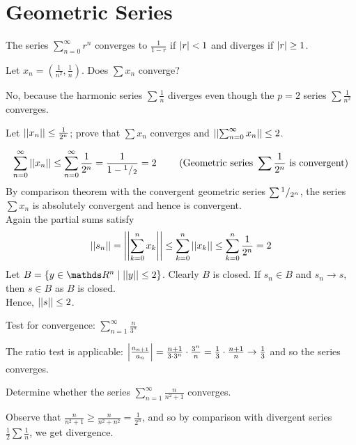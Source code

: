 \documentclass[../main-sheet.tex]{subfiles}
\begin{document}
\section{Geometric Series}
The series $ \sum_{n=0}^\infty r^n $ converges to $ \frac{1}{1-r} $ if $ \left\vert r\right\vert<1 $ and diverges if $ \left\vert r\right\vert\geq 1 $.
\begin{prob}
    Let $ x_n=\left( \frac{1}{n^2},\frac{1}{n} \right) $. Does $ \sum x_n $ converge?
\end{prob}
\begin{soln}
    No, because the harmonic series $ \sum \frac{1}{n} $ diverges even though the $ p=2 $ series $ \sum \frac{1}{n^2} $ converges.
\end{soln}
\begin{prob}
    Let $ \left\vert\left\vert x_n\right\vert\right\vert  \leq \frac{1}{2^n} $; prove that $ \sum x_n $ converges and $ \left\vert\left\vert\sum_{n=0}^\infty x_n\right\vert\right\vert\leq 2 $.
\end{prob}
\begin{soln}
    \[
        \sum_{n=0}^\infty \left\vert\left\vert x_n\right\vert\right\vert\leq \sum_{n=0}^\infty \frac{1}{2^n}=\frac{1}{1-{}^{1}/{}_{2}}=2\qquad \text{ (Geometric series } \sum \frac{1}{2^n} \text{ is convergent)}
    \]
    By comparison theorem with the convergent geometric series $ \sum {}^{1}/{}_{2^n} $, the series $ \sum x_n $ is absolutely convergent and hence is convergent.\\
    Again the partial sums satisfy
    \[
        \left\vert\left\vert s_n\right\vert\right\vert=\left\vert\left\vert\sum_{k=0}^n x_k\right\vert\right\vert\leq \sum_{k=0}^n \left\vert\left\vert x_k\right\vert\right\vert \leq \sum_{k=0}^n \frac{1}{2^n}=2
    \]
    Let $ B=\set{y\in\R^n\mid \norm{y}\leq 2} $. Clearly $ B $ is closed. If $ s_n\in B $ and $ s_n\to s $, then $ s\in B $ as $ B $ is closed.\\
    Hence, $ \left\vert\left\vert s\right\vert\right\vert\leq 2 $.
\end{soln}
\begin{prob}
    Test for convergence: $ \sum_{n=1}^\infty \frac{n}{3^n} $
\end{prob}
\begin{soln}
    The ratio test is applicable: $ \left\vert\frac{a_{n+1}}{a_n}\right\vert=\frac{n+1}{3\cdot 3^n}\cdot \frac{3^n}{n}=\frac{1}{3}\cdot\frac{n+1}{n}\to \frac{1}{3}      $ and so the series converges.
\end{soln}
\begin{prob}
    Determine whether the series $ \sum_{n=1}^\infty \frac{n}{n^2+1} $ converges.
\end{prob}
\begin{soln}
    Observe that $ \frac{n}{n^2+1}\geq \frac{n}{n^2+n^2}=\frac{1}{2^n} $, and so by comparison with divergent series $ \frac{1}{2}\sum \frac{1}{n} $, we get divergence.
\end{soln}
\end{document}
